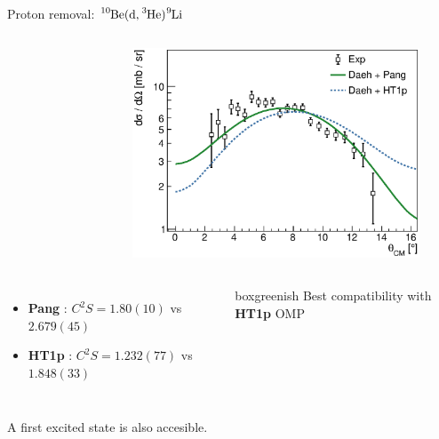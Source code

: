 \documentclass[sans,
frameno, %
mp,
usenames,dvipsnames, %
onlytextwidth, %
t,%
11pt]{beamer}
\newcommand{\iso}[2]{\ce{^{#1}#2}}
\begin{document}
\begin{frame}{Proton removal: $\iso{10}{Be}(\textrm{d}, \iso{3}{He})\iso{9}{Li}$}
{\begin{columns}[c]
{\begin{figure}
                \end{figure}
            }
            \hfill
            {
                \vspace{-12pt}
                \begin{figure}
                    \centering
                    \includegraphics[width=\linewidth, cfbox=Mulberry 1pt 0pt 0pt]{figures/Workshop/acculina_ht1p.eps}
                \end{figure}
            }
        \end{columns}
        \begin{columns}[c]
            {
                \begin{itemize}
                    \item \textbf{Pang} : $C^{2}S = 1.80(10)$ vs $2.679(45)$
                    \item \textbf{HT1p} : $C^{2}S = 1.232(77)$ vs $1.848(33)$
                \end{itemize}
            }
            \hfill
            {
                \hfill
                \begin{beamercolorbox}[sep=1ex,center, rounded=true, wd=0.95\linewidth]{boxgreenish}
                    Best compatibility with \textbf{HT1p} OMP
                \end{beamercolorbox}
                \hfill
            }
        \end{columns}
    }
    {
        A first excited state is also accesible.
        \begin{columns}[t]

\end{columns}}
\end{frame}
\end{document}
